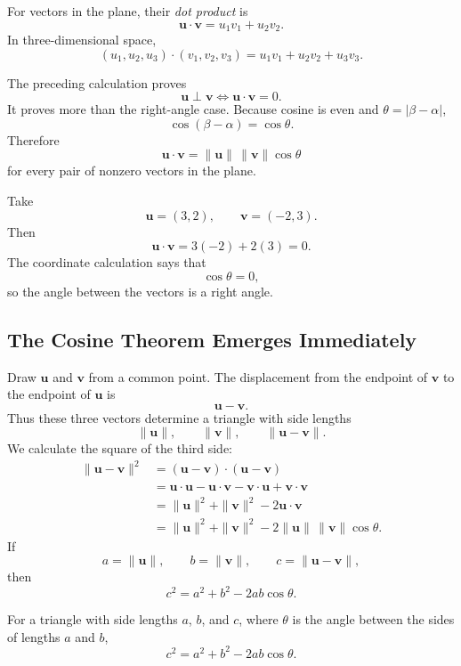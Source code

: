 \begin{definitionbox}
For vectors in the plane, their \emph{dot product} is
\[
\mathbf u\cdot\mathbf v
=
u_1v_1+u_2v_2.
\]
In three-dimensional space,
\[
(u_1,u_2,u_3)\cdot(v_1,v_2,v_3)
=
u_1v_1+u_2v_2+u_3v_3.
\]
\end{definitionbox}

The preceding calculation proves
\[
\mathbf u\perp\mathbf v
\iff
\mathbf u\cdot\mathbf v=0.
\]
It proves more than the right-angle case. Because cosine is even and
$\theta=|\beta-\alpha|$,
\[
\cos(\beta-\alpha)=\cos\theta.
\]
Therefore
\[
\boxed{\mathbf u\cdot\mathbf v
=
\|\mathbf u\|\,\|\mathbf v\|\cos\theta}
\]
for every pair of nonzero vectors in the plane.

\begin{examplebox}
Take
\[
\mathbf u=(3,2),
\qquad
\mathbf v=(-2,3).
\]
Then
\[
\mathbf u\cdot\mathbf v
=3(-2)+2(3)=0.
\]
The coordinate calculation says that
\[
\cos\theta=0,
\]
so the angle between the vectors is a right angle.
\end{examplebox}

\subsection{The Cosine Theorem Emerges Immediately}

Draw $\mathbf u$ and $\mathbf v$ from a common point. The displacement from the
endpoint of $\mathbf v$ to the endpoint of $\mathbf u$ is
\[
\mathbf u-\mathbf v.
\]
Thus these three vectors determine a triangle with side lengths
\[
\|\mathbf u\|,
\qquad
\|\mathbf v\|,
\qquad
\|\mathbf u-\mathbf v\|.
\]
We calculate the square of the third side:
\[
\begin{aligned}
\|\mathbf u-\mathbf v\|^2
&=(\mathbf u-\mathbf v)\cdot(\mathbf u-\mathbf v)\\
&=\mathbf u\cdot\mathbf u
-\mathbf u\cdot\mathbf v
-\mathbf v\cdot\mathbf u
+\mathbf v\cdot\mathbf v\\
&=\|\mathbf u\|^2+
\|\mathbf v\|^2-
2\mathbf u\cdot\mathbf v\\
&=\|\mathbf u\|^2+
\|\mathbf v\|^2-
2\|\mathbf u\|\,\|\mathbf v\|\cos\theta.
\end{aligned}
\]
If
\[
a=\|\mathbf u\|,
\qquad
b=\|\mathbf v\|,
\qquad
c=\|\mathbf u-\mathbf v\|,
\]
then
\[
\boxed{c^2=a^2+b^2-2ab\cos\theta}.
\]

\begin{theorembox}
For a triangle with side lengths $a$, $b$, and $c$, where $\theta$ is the angle
between the sides of lengths $a$ and $b$,
\[
c^2=a^2+b^2-2ab\cos\theta.
\]
\end{theorembox}

